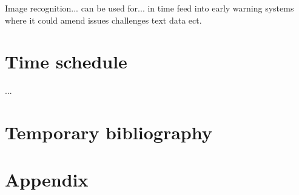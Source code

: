\documentclass[a4paper]{article}
\begin{document}



Image recognition... can be used for... in time feed into early warning systems where it could amend issues challenges text data ect.





\section{Time schedule} 
...

\section{Temporary bibliography}
 


\pagebreak
\section{Appendix}
\end{document}
